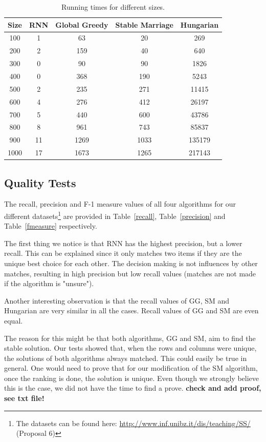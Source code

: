 \documentclass[a4paper,11pt]{article}
\begin{document}
\begin{table}[tbh]
\centering
\begin{tabular}{|c|c|c|c|c|}
\hline 
Size & RNN & Global Greedy & Stable Marriage & Hungarian \tabularnewline
\hline 
\hline 
 100 & 1 & 63 & 20 & 269\tabularnewline
\hline
 200 & 2 & 159 & 40 & 640\tabularnewline
\hline 
 300 & 0 & 90 & 90 & 1826\tabularnewline
\hline 
 400 & 0 & 368 & 190 & 5243\tabularnewline
\hline 
 500 & 2 & 235 & 271 & 11415\tabularnewline
\hline 
 600 & 4 & 276 & 412 & 26197\tabularnewline
\hline 
 700 & 5 & 440 & 600 & 43786\tabularnewline
\hline
 800 & 8 & 961 & 743 & 85837\tabularnewline
\hline 
 900 & 11 & 1269 & 1033 & 135179\tabularnewline
\hline
 1000 & 17 & 1673 & 1265 & 217143\tabularnewline
\hline 
\end{tabular}
\caption{Running times for different sizes.}
\label{runtimes}
\end{table}

\subsection{Quality Tests}

The recall, precision and F-1 measure values of all four algorithms for our different datasets\footnote{The datasets can be found here: \url{http://www.inf.unibz.it/dis/teaching/SS/} (Proposal 6)} are provided in Table~\ref{recall}, Table~\ref{precision} and Table~\ref{fmeasure} respectively. 

The first thing we notice is that RNN has the highest precision, but a lower recall. This can be explained since it only matches two items if they are the unique best choice for each other. The decision making is not influences by other matches, resulting in high precision but low recall values (matches are not made if the algorithm is "unsure").

Another interesting observation is that the recall values of GG, SM and Hungarian are very similar in all the cases. Recall values of GG and SM are even equal. %

The reason for this might be that both algorithms, GG and SM, aim to find the stable solution. Our tests showed that, when the rows and columns were unique, the solutions of both algorithms always matched. This could easily be true in general. One would need to prove that for our modification of the SM algorithm, once the ranking is done, the solution is unique. Even though we strongly believe this is the case, we did not have the time to find a prove.
\textbf{check and add proof, see txt file!}
\end{document}
